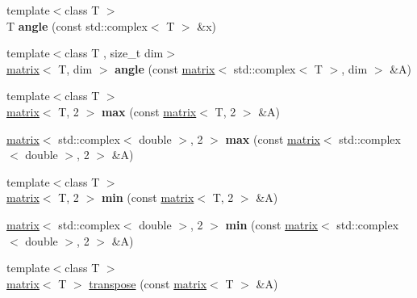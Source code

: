 \begin{DoxyCompactItemize}
\item 
\hypertarget{namespacekeycpp_aaa2e17334911e8a447a5ef6c0cc54c3f}{{\footnotesize template$<$class T $>$ }\\T {\bfseries angle} (const std\-::complex$<$ T $>$ \&x)}\label{namespacekeycpp_aaa2e17334911e8a447a5ef6c0cc54c3f}

\item 
\hypertarget{namespacekeycpp_afbbe373666d686c14e6ce6517d050373}{{\footnotesize template$<$class T , size\-\_\-t dim$>$ }\\\hyperlink{classkeycpp_1_1matrix}{matrix}$<$ T, dim $>$ {\bfseries angle} (const \hyperlink{classkeycpp_1_1matrix}{matrix}$<$ std\-::complex$<$ T $>$, dim $>$ \&A)}\label{namespacekeycpp_afbbe373666d686c14e6ce6517d050373}

\item 
\hypertarget{namespacekeycpp_a03b5a8f06ace0e74416f6b22fbefd1a0}{{\footnotesize template$<$class T $>$ }\\\hyperlink{classkeycpp_1_1matrix}{matrix}$<$ T, 2 $>$ {\bfseries max} (const \hyperlink{classkeycpp_1_1matrix}{matrix}$<$ T, 2 $>$ \&A)}\label{namespacekeycpp_a03b5a8f06ace0e74416f6b22fbefd1a0}

\item 
\hypertarget{namespacekeycpp_adafc954673ba1f1fb140d83ba1d88a23}{\hyperlink{classkeycpp_1_1matrix}{matrix}$<$ std\-::complex$<$ double $>$, 2 $>$ {\bfseries max} (const \hyperlink{classkeycpp_1_1matrix}{matrix}$<$ std\-::complex$<$ double $>$, 2 $>$ \&A)}\label{namespacekeycpp_adafc954673ba1f1fb140d83ba1d88a23}

\item 
\hypertarget{namespacekeycpp_a96f9dd276a27f616258da602ee559541}{{\footnotesize template$<$class T $>$ }\\\hyperlink{classkeycpp_1_1matrix}{matrix}$<$ T, 2 $>$ {\bfseries min} (const \hyperlink{classkeycpp_1_1matrix}{matrix}$<$ T, 2 $>$ \&A)}\label{namespacekeycpp_a96f9dd276a27f616258da602ee559541}

\item 
\hypertarget{namespacekeycpp_aa29add9ed4a57360a11fbf614df7f3a7}{\hyperlink{classkeycpp_1_1matrix}{matrix}$<$ std\-::complex$<$ double $>$, 2 $>$ {\bfseries min} (const \hyperlink{classkeycpp_1_1matrix}{matrix}$<$ std\-::complex$<$ double $>$, 2 $>$ \&A)}\label{namespacekeycpp_aa29add9ed4a57360a11fbf614df7f3a7}

\item 
\hypertarget{namespacekeycpp_a7fd5ce0385e9cc7bed5b44ed8475e8aa}{{\footnotesize template$<$class T $>$ }\\\hyperlink{classkeycpp_1_1matrix}{matrix}$<$ T $>$ \hyperlink{namespacekeycpp_a7fd5ce0385e9cc7bed5b44ed8475e8aa}{transpose} (const \hyperlink{classkeycpp_1_1matrix}{matrix}$<$ T $>$ \&A)}\label{namespacekeycpp_a7fd5ce0385e9cc7bed5b44ed8475e8aa}


\end{DoxyCompactItemize}
